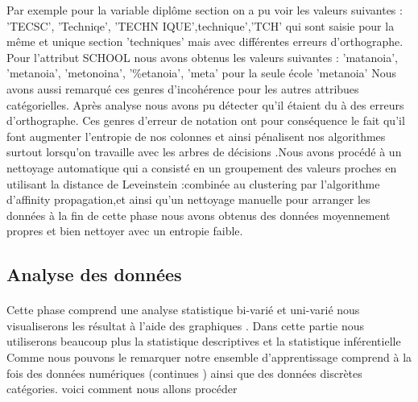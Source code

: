 Par exemple pour la variable diplôme section on a pu voir les valeurs suivantes : 'TECSC', 'Techniqe',
'TECHN IQUE',technique','TCH' qui sont saisie pour la même et unique
section 'techniques' mais avec différentes erreurs d'orthographe.
Pour l'attribut SCHOOL nous avons obtenus les valeurs suivantes :
'matanoia', 'metanoia', 'metonoina', '\%etanoia', 'meta' pour la seule école 'metanoia'
Nous avons aussi remarqué ces genres d'incohérence pour les autres attribues catégorielles.  
Après analyse nous avons pu détecter qu'il étaient  du à des erreurs d'orthographe.
Ces genres d'erreur de notation ont pour conséquence le fait qu'il font
augmenter l'entropie de nos colonnes et ainsi pénalisent nos algorithmes
surtout lorsqu'on travaille avec les arbres de décisions .Nous avons
procédé à un nettoyage automatique qui a consisté en un groupement des
valeurs proches en utilisant la distance de Leveinstein :\cite{LevStack}combinée au  clustering par l'algorithme d'affinity propagation,et
ainsi qu'un nettoyage manuelle pour arranger les données à la fin de
cette phase nous avons obtenus des données moyennement propres et bien
nettoyer avec un entropie faible.
 \subsection{Analyse des données}\label{analyse-des-donnuxe9es}
\paragraph{}
Cette phase comprend une analyse statistique bi-varié et uni-varié nous
visualiserons les résultat à l'aide des graphiques . Dans cette partie
nous utiliserons beaucoup plus la statistique descriptives et la statistique inférentielle
Comme nous  pouvons le remarquer notre ensemble d'apprentissage
comprend à la fois des données numériques (continues ) ainsi que des
données discrètes catégories. voici comment nous allons procéder

